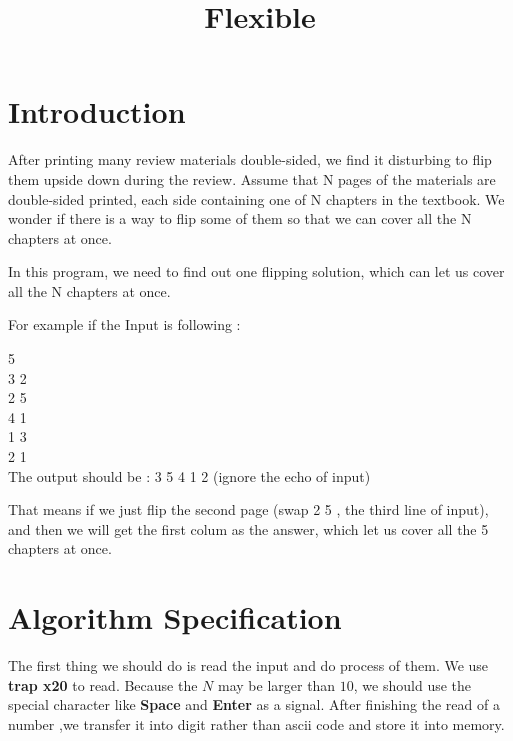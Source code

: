 \documentclass[twoside]{article}
\begin{document}
\begin{CJK*}{UTF8}{gbsn}
	\title{Flexible}
	\date{}

	\section{Introduction}
	After printing many review materials double-sided, we find it disturbing to flip them upside down during the review. Assume that N pages of the materials are double-sided printed, each side containing one of N chapters in the textbook. We wonder if there is a way to flip some of them so that we can cover all the N chapters at once.
	
	In this program, we need to find out one flipping solution, which can let us cover all the N chapters at once.
	
	For example if the Input is following :
	
	5\\
	3 2 \\2 5 \\4 1 \\1 3 \\2 1\\
	
	The output should be :
	3 5 4 1 2
	(ignore the echo of input)
	
	That means if we just flip the second page (swap 2 5 , the third line of input), and then we will get the first colum as the answer, which let us cover all the 5 chapters at once.
	
	
	\section{Algorithm Specification}
	
	The first thing we should do is read the input and do process of them. We use \textbf{trap x20} to read. Because the $N$ may be larger than $10$, we should use the special character like \textbf{Space} and \textbf{Enter} as a signal. After finishing the read of a number ,we transfer it into digit rather than ascii code and store it into memory.
	

\end{CJK*}
\end{document}
